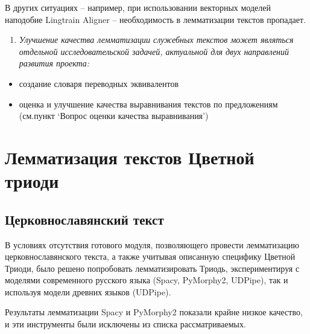 \documentclass[
  letterpaper,
]{book}
\providecommand{\tightlist}{%
  \setlength{\itemsep}{0pt}\setlength{\parskip}{0pt}}\usepackage{longtable,booktabs,array}
\begin{document}
В других ситуациях -- например, при использовании векторных моделей
наподобие Lingtrain Aligner -- необходимость в лемматизации текстов
пропадает.

\begin{enumerate}
\def\labelenumi{\arabic{enumi}.}
\tightlist
\item
  \emph{Улучшение качества лемматизации служебных текстов может являться
  отдельной исследовательской задачей, актуальной для двух направлений
  развития проекта:}
\end{enumerate}

\begin{itemize}
\tightlist
\item
  создание словаря переводных эквивалентов
\item
  оценка и улучшение качества выравнивания текстов по предложениям
  (см.пункт `Вопрос оценки качества выравнивания')
\end{itemize}

\hypertarget{ux43bux435ux43cux43cux430ux442ux438ux437ux430ux446ux438ux44f-ux442ux435ux43aux441ux442ux43eux432-ux446ux432ux435ux442ux43dux43eux439-ux442ux440ux438ux43eux434ux438}{%
\section{Лемматизация текстов Цветной
триоди}\label{ux43bux435ux43cux43cux430ux442ux438ux437ux430ux446ux438ux44f-ux442ux435ux43aux441ux442ux43eux432-ux446ux432ux435ux442ux43dux43eux439-ux442ux440ux438ux43eux434ux438}}

\hypertarget{ux446ux435ux440ux43aux43eux432ux43dux43eux441ux43bux430ux432ux44fux43dux441ux43aux438ux439-ux442ux435ux43aux441ux442}{%
\subsection{Церковнославянский
текст}\label{ux446ux435ux440ux43aux43eux432ux43dux43eux441ux43bux430ux432ux44fux43dux441ux43aux438ux439-ux442ux435ux43aux441ux442}}

В условиях отсутствия готового модуля, позволяющего провести
лемматизацию церковнославянского текста, а также учитывая описанную
специфику Цветной Триоди, было решено попробовать лемматизировать
Триодь, экспериментируя с моделями современного русского языка (Spacy,
PyMorphy2, UDPipe), так и используя модели древних языков (UDPipe).

Результаты лемматизации Spacy и PyMorphy2 показали крайне низкое
качество, и эти инструменты были исключены из списка рассматриваемых.
\end{document}
